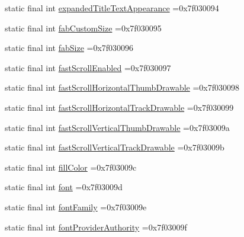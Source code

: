 \begin{DoxyCompactItemize}
\item 
static final int \mbox{\hyperlink{classcom_1_1example_1_1trainawearapplication_1_1_r_1_1attr_a764fad017c8024de08383ee6a59abf70}{expanded\+Title\+Text\+Appearance}} =0x7f030094
\item 
static final int \mbox{\hyperlink{classcom_1_1example_1_1trainawearapplication_1_1_r_1_1attr_a54c6c255d4ea8f5356c3c9e4a0034862}{fab\+Custom\+Size}} =0x7f030095
\item 
static final int \mbox{\hyperlink{classcom_1_1example_1_1trainawearapplication_1_1_r_1_1attr_a47846f87b8fa0180003303271c161d83}{fab\+Size}} =0x7f030096
\item 
static final int \mbox{\hyperlink{classcom_1_1example_1_1trainawearapplication_1_1_r_1_1attr_a9b037504bc6caff402aebe2354b3f1d2}{fast\+Scroll\+Enabled}} =0x7f030097
\item 
static final int \mbox{\hyperlink{classcom_1_1example_1_1trainawearapplication_1_1_r_1_1attr_a0f9190a1e762450b5198c6afb86fc6ca}{fast\+Scroll\+Horizontal\+Thumb\+Drawable}} =0x7f030098
\item 
static final int \mbox{\hyperlink{classcom_1_1example_1_1trainawearapplication_1_1_r_1_1attr_a7bf86194cbd55186f25ee2e6391f9aae}{fast\+Scroll\+Horizontal\+Track\+Drawable}} =0x7f030099
\item 
static final int \mbox{\hyperlink{classcom_1_1example_1_1trainawearapplication_1_1_r_1_1attr_a5e1c7b7a26aa361b918f3f1c305cae4d}{fast\+Scroll\+Vertical\+Thumb\+Drawable}} =0x7f03009a
\item 
static final int \mbox{\hyperlink{classcom_1_1example_1_1trainawearapplication_1_1_r_1_1attr_ace8664c2a8142938ecb7be31f0b37bd0}{fast\+Scroll\+Vertical\+Track\+Drawable}} =0x7f03009b
\item 
static final int \mbox{\hyperlink{classcom_1_1example_1_1trainawearapplication_1_1_r_1_1attr_aa74823ed58427f8552e21011e687097f}{fill\+Color}} =0x7f03009c
\item 
static final int \mbox{\hyperlink{classcom_1_1example_1_1trainawearapplication_1_1_r_1_1attr_a047dd58fee4de52a9ebea90832d88dfb}{font}} =0x7f03009d
\item 
static final int \mbox{\hyperlink{classcom_1_1example_1_1trainawearapplication_1_1_r_1_1attr_ab41cde48b260cd27c78c107eb7587a56}{font\+Family}} =0x7f03009e
\item 
static final int \mbox{\hyperlink{classcom_1_1example_1_1trainawearapplication_1_1_r_1_1attr_a7b0f91e56803c7a1e804082298193bda}{font\+Provider\+Authority}} =0x7f03009f
\item 

\end{DoxyCompactItemize}
